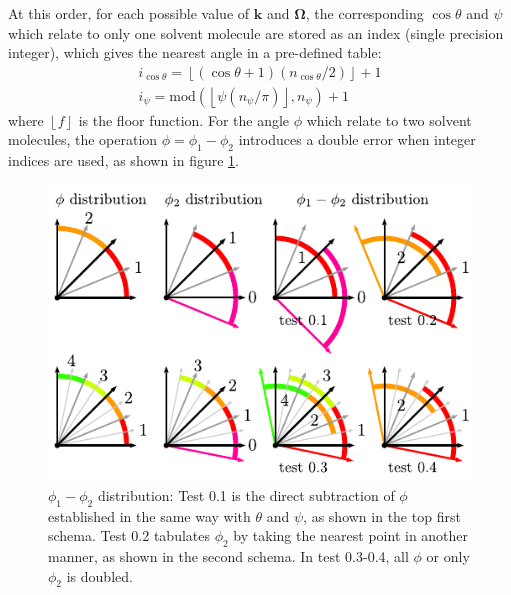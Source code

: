 At this order, for each possible value of $\mathbf{k}$ and $\mathbf{\Omega}$,
the corresponding $\cos\theta$ and $\psi$ which relate to only one
solvent molecule are stored as an index (single precision integer),
which gives the nearest angle in a pre-defined table:
\begin{equation}
\begin{array}{l}
i_{\cos\theta}=\left\lfloor (\cos\theta+1)(n_{\cos\theta}/2)\right\rfloor +1\\
i_{\psi}=\mathrm{mod}(\left\lfloor \psi(n_{\psi}/\pi)\right\rfloor ,n_{\psi})+1
\end{array}
\end{equation}
where $\left\lfloor f\right\rfloor $ is the floor function. For the
angle $\phi$ which relate to two solvent molecules, the operation
$\phi=\phi_{1}-\phi_{2}$ introduces a double error when integer indices
are used, as shown in figure \ref{fig:diff_phi}.

\begin{figure}[h]
\begin{centering}
\includegraphics{_figure/diff_phi}
\par\end{centering}

\caption[$\phi_{1}-\phi_{2}$ distribution]{$\phi_{1}-\phi_{2}$ distribution: Test 0.1 is the direct subtraction
of $\phi$ established in the same way with $\theta$ and $\psi$,
as shown in the top first schema. Test 0.2 tabulates $\phi_{2}$ by
taking the nearest point in another manner, as shown in the second
schema. In test 0.3-0.4, all $\phi$ or only $\phi_{2}$ is doubled.\label{fig:diff_phi}}
\end{figure}


